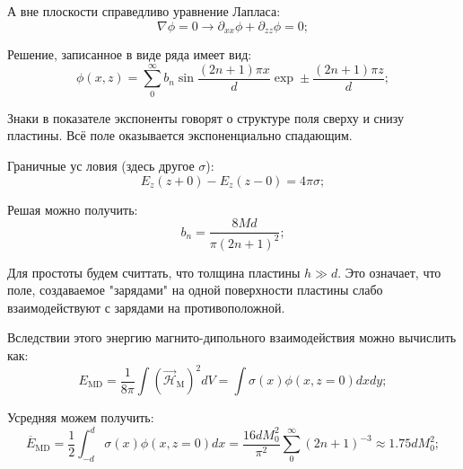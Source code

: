 \documentclass[a4paper, 14pt, russian]{article}
\newcommand{\be}{\begin{equation}}
\newcommand{\ee}{\end{equation}}
\newcommand{\pa}{\partial}
\begin{document}
	А вне плоскости справедливо уравнение Лапласа:
	\be
		\nabla \phi = 0 \rightarrow \pa_{xx} \phi + \pa_{zz} \phi = 0;
	\ee

	Решение, записанное в виде ряда имеет вид:
	\be
		\label{eq153}
		\phi(x, z) = \sum_0^\infty b_n \sin \frac{(2n + 1)\pi x}{d} 
		\exp \pm \frac{(2n + 1) \pi z}{d};
	\ee

	Знаки в показателе экспоненты говорят о структуре поля сверху и снизу пластины.
	Всё поле оказывается экспоненциально спадающим.

	Граничные ус ловия (здесь другое $\sigma$):
	\be
		\label{eq154}
		E_z(z + 0) - E_z(z - 0) = 4 \pi \sigma;
	\ee

	Решая можно получить:
	\be
		\label{eq155}
		b_n = \frac{8 M d}{\pi (2 n + 1)^2};
	\ee

	Для простоты будем считтать, что толщина пластины $h \gg d$. Это означает,
	что поле, создаваемое "зарядами" на одной поверхности пластины слабо
	взаимодействуют с зарядами на противоположной.

	Вследствии этого энергию магнито-дипольного взаимодействия можно вычислить как:
	\be
		\label{eq156}
		E_\text{MD} = \frac{1}{8\pi} \int (\vec{\mathcal H}_\text{M})^2 dV = 
			\int \sigma(x) \phi(x, z = 0) dx dy;
	\ee


	Усредняя можем получить:
	\be
		\label{eq157}
		\overline{E}_\text{MD} = \frac{1}{2} \int_{-d}^{d} \sigma(x) \phi(x, z= 0) dx 
			= \frac{16 d M_0^2}{\pi^2} \sum_0^\infty (2n + 1)^{-3} 
			\approx 1.75 d M_0^2; 
	\ee
\end{document}

